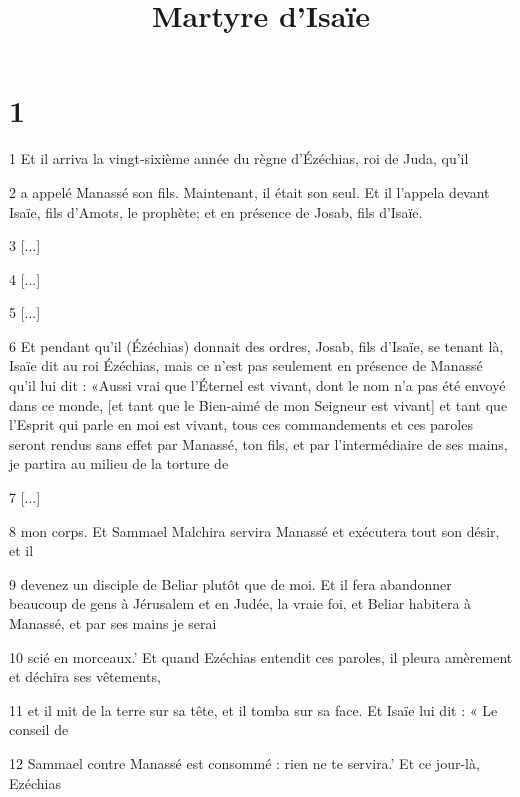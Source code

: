 

\title{Martyre d'Isaïe}

\chapter{1}

\par 1 Et il arriva la vingt-sixième année du règne d'Ézéchias, roi de Juda, qu'il

\par 2 a appelé Manassé son fils. Maintenant, il était son seul. Et il l'appela devant Isaïe, fils d'Amots, le prophète; et en présence de Josab, fils d'Isaïe.

\par 3 [...]

\par 4 [...]

\par 5 [...]

\par 6 Et pendant qu'il (Ézéchias) donnait des ordres, Josab, fils d'Isaïe, se tenant là, Isaïe dit au roi Ézéchias, mais ce n'est pas seulement en présence de Manassé qu'il lui dit : «Aussi vrai que l'Éternel est vivant, dont le nom n'a pas été envoyé dans ce monde, [et tant que le Bien-aimé de mon Seigneur est vivant] et tant que l'Esprit qui parle en moi est vivant, tous ces commandements et ces paroles seront rendus sans effet par Manassé, ton fils, et par l'intermédiaire de ses mains, je partira au milieu de la torture de

\par 7 [...]

\par 8 mon corps. Et Sammael Malchira servira Manassé et exécutera tout son désir, et il

\par 9 devenez un disciple de Beliar plutôt que de moi. Et il fera abandonner beaucoup de gens à Jérusalem et en Judée, la vraie foi, et Beliar habitera à Manassé, et par ses mains je serai

\par 10 scié en morceaux.' Et quand Ezéchias entendit ces paroles, il pleura amèrement et déchira ses vêtements,

\par 11 et il mit de la terre sur sa tête, et il tomba sur sa face. Et Isaïe lui dit : « Le conseil de

\par 12 Sammael contre Manassé est consommé : rien ne te servira.' Et ce jour-là, Ezéchias

